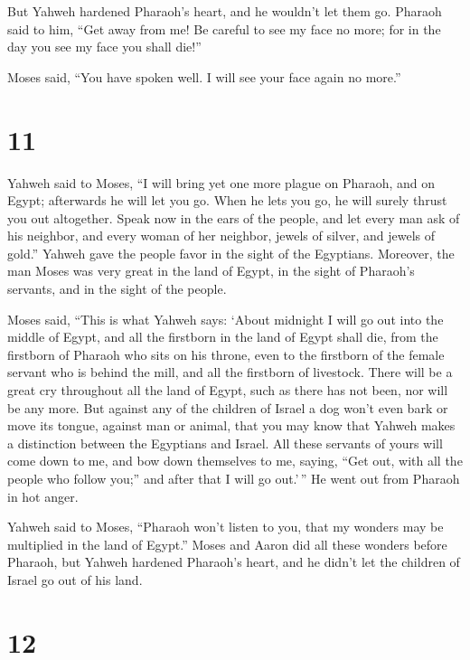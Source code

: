  But Yahweh hardened Pharaoh's heart, and he wouldn't let
them go.  Pharaoh said to him, ``Get away from me! Be
careful to see my face no more; for in the day you see my face you shall
die!''

 Moses said, ``You have spoken well. I will see your face
again no more.''

\hypertarget{section-10}{%
\section{11}\label{section-10}}

 Yahweh said to Moses, ``I will bring yet one more plague on
Pharaoh, and on Egypt; afterwards he will let you go. When he lets you
go, he will surely thrust you out altogether.  Speak now in
the ears of the people, and let every man ask of his neighbor, and every
woman of her neighbor, jewels of silver, and jewels of gold.''
 Yahweh gave the people favor in the sight of the Egyptians.
Moreover, the man Moses was very great in the land of Egypt, in the
sight of Pharaoh's servants, and in the sight of the people.

 Moses said, ``This is what Yahweh says: `About midnight I
will go out into the middle of Egypt,  and all the firstborn
in the land of Egypt shall die, from the firstborn of Pharaoh who sits
on his throne, even to the firstborn of the female servant who is behind
the mill, and all the firstborn of livestock.  There will be
a great cry throughout all the land of Egypt, such as there has not
been, nor will be any more.  But against any of the children
of Israel a dog won't even bark or move its tongue, against man or
animal, that you may know that Yahweh makes a distinction between the
Egyptians and Israel.  All these servants of yours will come
down to me, and bow down themselves to me, saying, ``Get out, with all
the people who follow you;'' and after that I will go out.'\,'' He went
out from Pharaoh in hot anger.

 Yahweh said to Moses, ``Pharaoh won't listen to you, that
my wonders may be multiplied in the land of Egypt.''  Moses
and Aaron did all these wonders before Pharaoh, but Yahweh hardened
Pharaoh's heart, and he didn't let the children of Israel go out of his
land.

\hypertarget{section-11}{%
\section{12}\label{section-11}}

